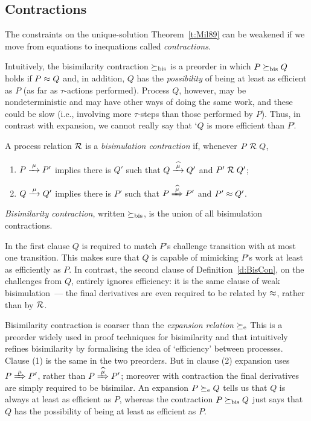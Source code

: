 \subsection{Contractions}
\label{s:mcontr}

The constraints on the unique-solution Theorem~\ref{t:Mil89} can be 
weakened if  we move from equations to inequations called
  \emph{contractions}.


  Intuitively,
  the bisimilarity contraction 
$\mathrel{\succeq_{\rm{bis}}}$ 
 is  a preorder in which 
$P \mathrel{\succeq_{\rm{bis}}} Q  $  holds  if $P \approx Q$ and, in addition, 
$Q$ has the \emph{possibility} of being at least as efficient as $P$ (as far as
$\tau$-actions performed). 
Process $Q$, however, may be nondeterministic and may have other ways
of doing the same work, and these could be  slow (i.e., involving
more $\tau$-steps than those performed by $P$).
Thus, in contrast with expansion,  we cannot really say that `$Q$ is more efficient than
$P$'.


\begin{definition}
\label{d:BisCon}
A process relation ${{\cal R}}$ 
 is a {\em  bisimulation  contraction}  if, whenever
 $P\mathrel{\cal R} Q$, %


\begin{enumerate}

\item   $P \arr\mu P'$ implies there is $Q'$ such that $Q \arcap \mu
  Q'$
 and $P' \mathrel{\cal R} Q'$;

\item 
    $Q \arr\mu Q'$   implies there is $P'$ such that $P \Arcap \mu
 P'$ and $P' 
\approx Q'$.
\end{enumerate}
\emph{Bisimilarity  contraction}, written $\mathrel{\succeq_{\rm{bis}}}$, is the union
of all bisimulation contractions. 
\end{definition}

In the first clause $Q$ is required to match $P$'s challenge
transition with at most one transition.
This makes sure that $Q$ is capable of mimicking $P$'s
work at least as efficiently as $P$. 
In contrast, the second clause of Definition~\ref{d:BisCon}, on the
challenges from $Q$, entirely ignores efficiency: it is the same
clause of  weak bisimulation~--- the final derivatives are even required
to be related  by $\approx$, rather than by ${\cal R}$.
 

Bisimilarity  contraction is coarser than 
 the \emph{expansion  relation} 
$\mathrel{\succeq_{\rm{e}}}$ \cite{sangiorgi2015equations} %
This is a
preorder widely used in proof techniques for bisimilarity and that 
intuitively refines bisimilarity by 
 formalising the idea of `efficiency' between processes.
Clause (1) is the same in the two
preorders. But in clause (2) expansion uses 
$P \Arr \mu P'$, rather than $P \Arcap \mu P'$; 
 moreover with
contraction the final derivatives are simply required to be bisimilar.
An expansion 
$P \mathrel{\succeq_{\rm{e}}} Q$
tells us  that $Q$ is always at least as efficient as $P$, whereas  the
 contraction $P \mathrel{\succeq_{\rm{bis}}} Q$  just says that $Q$ has the  possibility of
being at least as efficient as $P$. 

